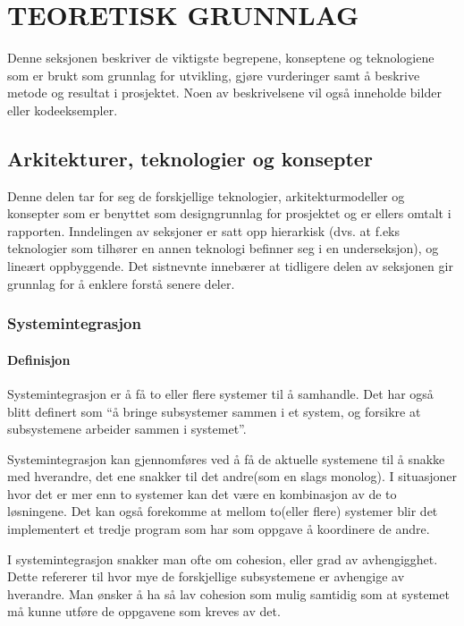 \documentclass[../main.tex]{subfiles}
\begin{document}
\chapter{TEORETISK GRUNNLAG}

Denne seksjonen beskriver de viktigste begrepene, konseptene og teknologiene som er brukt som grunnlag for utvikling, gjøre vurderinger samt å beskrive metode og resultat i prosjektet. Noen av beskrivelsene vil også inneholde bilder eller kodeeksempler.

\section{Arkitekturer, teknologier og konsepter}

Denne delen tar for seg de forskjellige teknologier, arkitekturmodeller og konsepter som er benyttet som designgrunnlag for prosjektet og er ellers omtalt i rapporten. Inndelingen av seksjoner er satt opp hierarkisk (dvs. at f.eks teknologier som tilhører en annen teknologi befinner seg i en underseksjon), og lineært oppbyggende. Det sistnevnte innebærer at tidligere delen av seksjonen gir grunnlag for å enklere forstå senere deler.

\subsection{Systemintegrasjon}

\subsubsection{Definisjon}
Systemintegrasjon er å få to eller flere systemer til å samhandle. Det har også blitt definert som “å bringe subsystemer sammen i et system, og forsikre at subsystemene arbeider sammen i systemet”. 

Systemintegrasjon kan gjennomføres ved å få de aktuelle systemene til å snakke med hverandre, det ene snakker til det andre(som en slags monolog). I situasjoner hvor det er mer enn to systemer kan det være en kombinasjon av de to løsningene. Det kan også forekomme at mellom to(eller flere) systemer blir det implementert et tredje program som har som oppgave å koordinere de andre.

I systemintegrasjon snakker man ofte om cohesion, eller grad av avhengigghet. Dette refererer til hvor mye de forskjellige subsystemene er avhengige av hverandre. Man ønsker å ha så lav cohesion som mulig samtidig som at systemet må kunne utføre de oppgavene som kreves av det.
\end{document}
